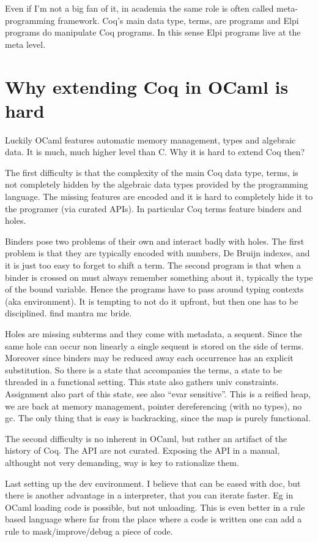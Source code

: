 \documentclass[a4paper, 11pt]{book}
\begin{document}
Even if I'm not a big fan of it, in academia the same role is often called
meta-programming framework. Coq's main data type, terms, are programs and Elpi
programs do manipulate Coq programs. In this sense Elpi programs live at the
meta level.

\section{Why extending Coq in OCaml is hard}

Luckily OCaml features automatic memory management, types and algebraic data.
It is much, much higher level than C. Why it is hard to extend Coq then?

The first difficulty is that the complexity of the main Coq data type, terms,
is not completely hidden by the algebraic data types provided by the programming
language. The missing features are encoded and it is hard to completely hide
it to the programer (via curated APIs). In particular Coq terms feature binders
and holes. 

Binders pose two problems of their own and interact badly with holes.
The first problem is that they are typically encoded with numbers, De Bruijn
indexes, and it is just too easy to forget to shift a term.  The second program
is that when a binder is crossed on must always remember something about it,
typically the type of the bound variable. Hence the programs have to pass around
typing contexts (aka environment). It is tempting to not do it upfront, but
then one has to be disciplined. find mantra mc bride.

Holes are missing subterms and they come with metadata, a sequent.
Since the same hole can occur non linearly a single sequent is stored on the side of terms.
Moreover since binders may be reduced away each occurrence has an explicit
substitution. So there is a state that accompanies the terms, a state to be
threaded in a functional setting. This state also gathers univ constraints.
Assignment also part of this state, see also ``evar sensitive''. This is
a reified heap, we are back at memory management, pointer dereferencing (with no
types), no gc. The only thing that is easy is backracking, since the map is
purely functional.

The second difficulty is no inherent in OCaml, but rather an artifact of the
history of Coq. The API are not curated. Exposing the API in a manual, althought
not very demanding, way is key to rationalize them.


Last setting up the dev environment. I believe that can be eased with doc, but
there is another advantage in a interpreter, that you can iterate faster. Eg
in OCaml loading code is possible, but not unloading. This is even better in
a rule based language where far from the place where a code is written one
can add a rule to mask/improve/debug a piece of code.
\end{document}
